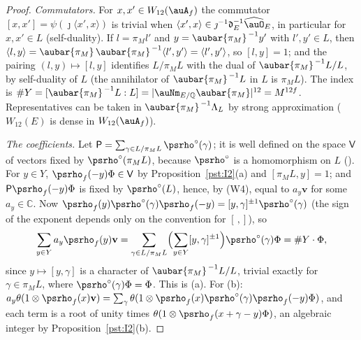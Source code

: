 \documentclass[10pt]{amsart}
\theoremstyle{definition}
\theoremstyle{remark}
\newcommand{\C}{\mathbb C}
\newcommand{\Q}{\mathbb Q}
\providecommand{\psvac}{\mathbf v}
\begin{document}
\begin{proof}
\emph{Commutators.} For $x,x'\in W_{12}(\auA_f)$ the commutator $[x,x']=\psi(\jmath\langle x',x
\rangle)$ is trivial when $\langle x',x\rangle\in\jmath^{-1}\mathfrak d_E^{-1}\widehat\auO_E$, in
particular for $x,x'\in L$ (self-duality). If $l=\pi_Ml'$ and $y=\aubar{\pi_M}^{\,-1}y'$ with
$l',y'\in L$, then $\langle l,y\rangle=\aubar{\pi_M}\,\aubar{\pi_M}^{\,-1}\langle l',y'\rangle=
\langle l',y'\rangle$, so $[l,y]=1$; and the pairing $(l,y)\mapsto[l,y]$ identifies $L/\pi_ML$ with
the dual of $\aubar{\pi_M}^{\,-1}L/L$, by self-duality of $L$ (the annihilator of
$\aubar{\pi_M}^{\,-1}L$ in $L$ is $\pi_ML$). The index is $\#Y=[\aubar{\pi_M}^{\,-1}L:L]=
|\auNm_{E/\Q}\aubar{\pi_M}|^{12}=M^{12f}$. Representatives can be taken in $\aubar{\pi_M}^{\,-1}
\Lambda_L$ by strong approximation ($W_{12}(E)$ is dense in $W_{12}(\auA_f)$).

\emph{The coefficients.} Let $\mathsf P=\sum_{\gamma\in L/\pi_ML}\psrho^\circ(\gamma)$; it is well
defined on the space $\mathsf V$ of vectors fixed by $\psrho^\circ(\pi_ML)$, because $\psrho^\circ$ is
a homomorphism on $L$ ({\cite[\S7.4]{P49}}). For $y\in Y$, $\psrho_f(-y)\Phi\in\mathsf V$ by
Proposition~\ref{pst:I2}(a) and $[\pi_ML,y]=1$; and $\mathsf P\psrho_f(-y)\Phi$ is fixed by
$\psrho^\circ(L)$, hence, by (W4), equal to $a_y\psvac$ for some $a_y\in\C$. Now
$\psrho_f(y)\psrho^\circ(\gamma)\psrho_f(-y)=[y,\gamma]^{\pm1}\psrho^\circ(\gamma)$ (the sign of the
exponent depends only on the convention for $[\,,]$), so
\[
\sum_{y\in Y}a_y\psrho_f(y)\psvac=\sum_{\gamma\in L/\pi_ML}\Bigl(\sum_{y\in Y}[y,\gamma]^{\pm1}\Bigr)
\psrho^\circ(\gamma)\Phi=\#Y\cdot\Phi ,
\]
since $y\mapsto[y,\gamma]$ is a character of $\aubar{\pi_M}^{\,-1}L/L$, trivial exactly for
$\gamma\in\pi_ML$, where $\psrho^\circ(\gamma)\Phi=\Phi$. This is (a). For (b):
$a_y\theta(1\otimes\psrho_f(x)\psvac)=\sum_\gamma\theta(1\otimes\psrho_f(x)\psrho^\circ(\gamma)
\psrho_f(-y)\Phi)$, and each term is a root of unity times $\theta(1\otimes\psrho_f(x+\gamma-y)
\Phi)$, an algebraic integer by Proposition~\ref{pst:I2}(b).


\end{proof}
\end{document}
